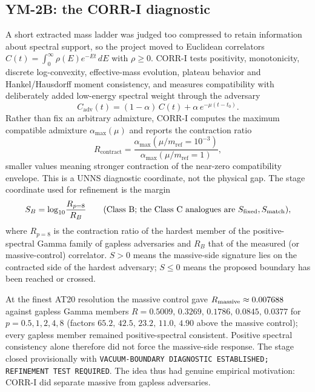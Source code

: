 \documentclass[11pt,a4paper]{article}
\theoremstyle{definition}
\theoremstyle{remark}
\newcommand{\uns}{UNNS}
\begin{document}
\subsection{YM-2B: the CORR-I diagnostic}
A short extracted mass ladder was judged too compressed to retain information about spectral support, so the project moved to Euclidean correlators $C(t)=\int_0^\infty\rho(E)e^{-Et}\,dE$ with $\rho\ge0$. CORR-I tests positivity, monotonicity, discrete log-convexity, effective-mass evolution, plateau behavior and Hankel/Hausdorff moment consistency, and measures compatibility with deliberately added low-energy spectral weight through the adversary
\begin{equation}
C_{\mathrm{adv}}(t)=(1-\alpha)\,C(t)+\alpha\,e^{-\mu(t-t_0)} .
\end{equation}
Rather than fix an arbitrary admixture, CORR-I computes the maximum compatible admixture $\alpha_{\max}(\mu)$ and reports the contraction ratio
\begin{equation}
R_{\mathrm{contract}}=\frac{\alpha_{\max}(\mu/m_{\mathrm{ref}}=10^{-3})}{\alpha_{\max}(\mu/m_{\mathrm{ref}}=1)} ,
\end{equation}
smaller values meaning stronger contraction of the near-zero compatibility envelope. This is a \uns{} diagnostic coordinate, not the physical gap. The stage coordinate used for refinement is the margin
\begin{equation}
S_B=\log_{10}\!\frac{R_{p=8}}{R_B}\qquad(\text{Class B;\ the Class C analogues are }S_{\rm fixed},S_{\rm match}),
\end{equation}
where $R_{p=8}$ is the contraction ratio of the hardest member of the positive-spectral Gamma family of gapless adversaries and $R_B$ that of the measured (or massive-control) correlator. $S>0$ means the massive-side signature lies on the contracted side of the hardest adversary; $S\le0$ means the proposed boundary has been reached or crossed.

At the finest AT20 resolution the massive control gave $R_{\rm massive}\approx0.007688$ against gapless Gamma members $R=0.5009,\,0.3269,\,0.1786,\,0.0845,\,0.0377$ for $p=0.5,1,2,4,8$ (factors $65.2,\,42.5,\,23.2,\,11.0,\,4.90$ above the massive control); every gapless member remained positive-spectral consistent. Positive spectral consistency alone therefore did not force the massive-side response. The stage closed provisionally with \texttt{VACUUM-\allowbreak{}BOUNDARY DIAGNOSTIC ESTABLISHED; REFINEMENT TEST REQUIRED}. The idea thus had genuine empirical motivation: CORR-I did separate massive from gapless adversaries.
\end{document}
